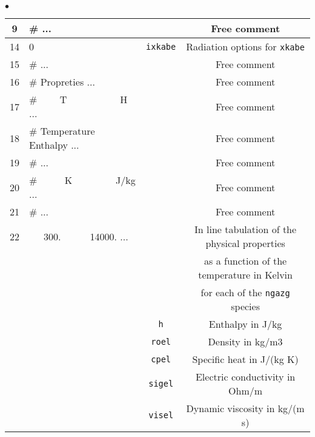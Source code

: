 {{{\begin{list}{$\bullet$}{}
\begin{table}[htbp]
\begin{center}
{\begin{tabular}{|c|l|c|c|}
  9     &\#                            ... &           & Free comment                                       \\ \hline
 14     &        0           & \texttt{ixkabe\index{ixkabe}} & Radiation options for \texttt{xkabe\index{xkabe}}   \\ \hline
 15     &\#                            ... &           & Free comment                                       \\ \hline
 16     &\#  Propreties                ... &           & Free comment                                       \\ \hline
 17     &\#  ~~~~T~~~~~~~~~~~H         ... &           & Free comment                                       \\ \hline
 18     &\#  Temperature  Enthalpy    ... &           & Free comment                                       \\ \hline
 19     &\#                            ... &           & Free comment                                       \\ \hline
 20     &\#  ~~~~~K~~~~~~~~~J/kg       ... &           & Free comment                                       \\ \hline
 21     &\#                            ... &           & Free comment                                       \\ \hline
 22     &    ~~~300.~~~~~~14000.       ... &           & In line tabulation of the physical properties      \\
        &                                  &           & as a function of the temperature in Kelvin         \\
        &                                  &           & for each of the \texttt{ngazg} species             \\
        &                    &    \texttt{h}                    & Enthalpy in J/kg                                   \\
        &                    &    \texttt{roel}                 & Density in kg/m3                                   \\
        &                    &    \texttt{cpel}                 & Specific heat in J/(kg K)                          \\
        &                    &    \texttt{sigel}                & Electric conductivity in Ohm/m                     \\
        &                    &    \texttt{visel}                & Dynamic viscosity in kg/(m s)                      \\

\end{tabular}}
\end{center}
\end{table}
\end{list}}}}

